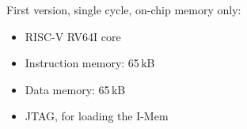 First version, single cycle, on-chip memory only:
\begin{itemize}
  \item RISC-V RV64I core
  \item Instruction memory: 65\,kB
  \item Data memory: 65\,kB
  \item JTAG, for loading the I-Mem
\end{itemize}